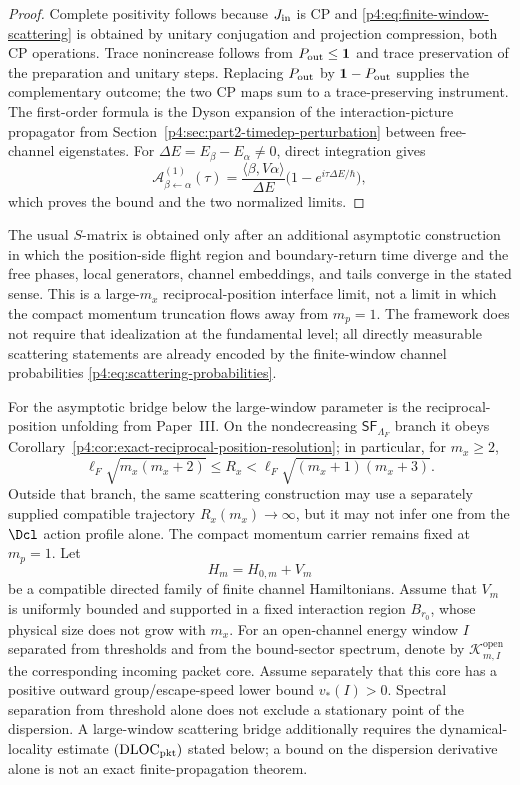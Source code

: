 \documentclass[12pt,a4paper]{article}
\begin{document}
\begin{proof}
Complete positivity follows because \(J_{\rm in}\) is CP and
\eqref{p4:eq:finite-window-scattering} is obtained by unitary conjugation
and projection compression, both CP operations.  Trace nonincrease follows
from \(P_{\rm out}\le\mathbf1\) and trace preservation of the preparation and
unitary steps.  Replacing \(P_{\rm out}\) by
\(\mathbf1-P_{\rm out}\) supplies the complementary outcome; the two CP maps
sum to a trace-preserving instrument.
The first-order formula is the Dyson expansion of the interaction-picture propagator from Section~\ref{p4:sec:part2-timedep-perturbation} between free-channel eigenstates.
For \(\Delta E=E_\beta-E_\alpha\ne0\), direct integration gives
\[
\mathcal A^{(1)}_{\beta\leftarrow\alpha}(\tau)
=
\frac{\langle\beta,V\alpha\rangle}{\Delta E}
\bigl(1-e^{i\tau\Delta E/\hbar}\bigr),
\]
which proves the bound and the two normalized limits.
\end{proof}

\begin{remark}
\label{p4:rem:scattering-smatrix}
The usual $S$-matrix is obtained only after an additional asymptotic
construction in which the position-side flight region and boundary-return
time diverge and the free phases, local generators, channel embeddings, and
tails converge in the stated sense.  This is a large-\(m_x\)
reciprocal-position interface limit, not a limit in which the compact
momentum truncation flows away from \(m_p=1\).
The framework does not require that idealization at the fundamental level; all directly measurable scattering statements are already encoded by the finite-window channel probabilities \eqref{p4:eq:scattering-probabilities}.
\end{remark}

For the asymptotic bridge below the large-window parameter is the
reciprocal-position unfolding from Paper~III.  On the nondecreasing
\(\mathsf{SF}_{\Lambda_F}\) branch it obeys
Corollary~\ref{p4:cor:exact-reciprocal-position-resolution}; in particular,
for \(m_x\ge2\),
\[
\ell_F\sqrt{m_x(m_x+2)}
\le R_x
<\ell_F\sqrt{(m_x+1)(m_x+3)}.
\]
Outside that branch, the same scattering construction may use a separately
supplied compatible trajectory \(R_x(m_x)\to\infty\), but it may not infer
one from the \(\Dcl\) action profile alone.  The compact momentum carrier
remains fixed at \(m_p=1\).  Let
\[
H_m=H_{0,m}+V_m
\]
be a compatible directed family of finite channel Hamiltonians.  Assume that
\(V_m\) is uniformly bounded and supported in a fixed interaction region
\(B_{r_0}\), whose physical size does not grow with \(m_x\).  For an
open-channel energy window \(I\) separated from thresholds and from the
bound-sector spectrum, denote by \(\mathcal K^{\mathrm{open}}_{m,I}\) the
corresponding incoming packet core.  Assume separately that this core has a
positive outward group/escape-speed lower bound \(v_*(I)>0\).  Spectral
separation from threshold alone does not exclude a stationary point of the
dispersion.  A large-window scattering
bridge additionally requires the dynamical-locality estimate
\((\mathrm{DLOC}_{\rm pkt})\) stated below; a bound on the dispersion derivative
alone is not an exact finite-propagation theorem.
\end{document}

